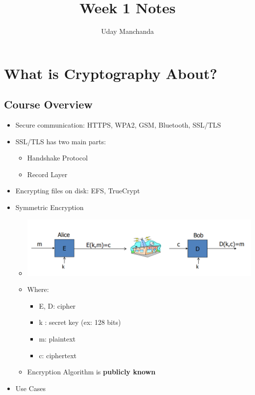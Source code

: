 \documentclass[]{article}
\title{Week 1 Notes}
\author{Uday Manchanda}
\begin{document}
\maketitle

\begin{abstract}
\end{abstract}

\section{What is Cryptography About?}
\subsection{Course Overview}
\begin{itemize}
	\item Secure communication: HTTPS, WPA2, GSM, Bluetooth, SSL/TLS
	\item SSL/TLS has two main parts:
	\begin{itemize}
		\item Handshake Protocol
		\item Record Layer
	\end{itemize}
	\item Encrypting files on disk: EFS, TrueCrypt
	\item Symmetric Encryption
	\begin{itemize}
		\item \includegraphics[width=\textwidth]{SymmetricKeyEncryption}
		\item Where:
		\begin{itemize}
			\item E, D: cipher
			\item k : secret key (ex: 128 bits)
			\item m: plaintext
			\item c: ciphertext
		\end{itemize}
		\item Encryption Algorithm is \textbf{publicly known}
	\end{itemize}
	\item Use Cases

\end{itemize}
\end{document}
